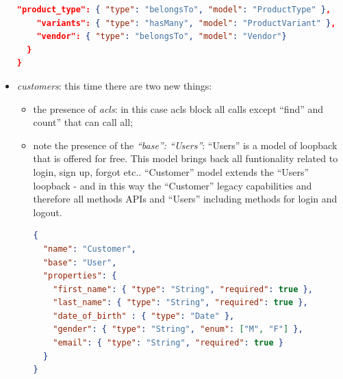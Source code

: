 \begin{itemize}
\begin{lstlisting}[language=json]
    "product_type": { "type": "belongsTo", "model": "ProductType" },
    "variants": { "type": "hasMany", "model": "ProductVariant" },
    "vendor": { "type": "belongsTo", "model": "Vendor"}
  }
}
\end{lstlisting}
\item \emph{customers}: this time there are two new things:
\begin{itemize}
\item the presence of \emph{acls}: in this case acls block all calls except “find” and count” that can call all;
\item note the presence of the \emph{“base”: “Users”}: “Users” is a model of loopback that is offered for free. This model brings back all funtionality related to login, sign up, forgot etc.. “Customer” model extends the “Users” loopback - and in this way the “Customer” legacy capabilities and therefore all methods APIs and “Users” including methods for login and logout.
\begin{lstlisting}[language=json]
{
  "name": "Customer",
  "base": "User",
  "properties": {
    "first_name": { "type": "String", "required": true },
    "last_name": { "type": "String", "required": true },
    "date_of_birth" : { "type": "Date" },
    "gender": { "type": "String", "enum": ["M", "F"] },
    "email": { "type": "String", "required": true }
  }
}
\end{lstlisting}
\end{itemize}
\end{itemize}

